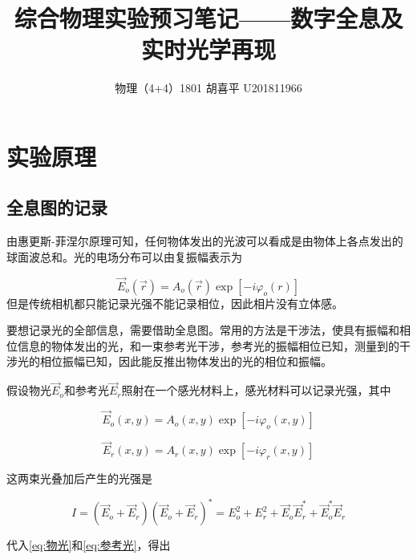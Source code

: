\documentclass{article}
\author{物理（4+4）1801 \quad  胡喜平 \quad U201811966}
\affil{个人网站 https://hxp.plus/ \quad 电子邮件 hxp201406@gmail.com}
\title{综合物理实验预习笔记——数字全息及实时光学再现}
\begin{document}
\maketitle\thispagestyle{fancy}




\section{实验原理}

\subsection{全息图的记录}

由惠更斯-菲涅尔原理可知，任何物体发出的光波可以看成是由物体上各点发出的球面波总和。光的电场分布可以由复振幅表示为

\begin{equation}
  \vec{E}_o \left( \vec{r} \right) = A_o \left( \vec{r} \right)  \exp \left[ - i \varphi_o \left( r \right) \right]
\end{equation}
但是传统相机都只能记录光强不能记录相位，因此相片没有立体感。

要想记录光的全部信息，需要借助全息图。常用的方法是干涉法，使具有振幅和相位信息的物体发出的光，和一束参考光干涉，参考光的振幅相位已知，测量到的干涉光的相位振幅已知，因此能反推出物体发出的光的相位和振幅。

假设物光$\vec{E}_o$和参考光$\vec{E}_r$照射在一个感光材料上，感光材料可以记录光强，其中

\begin{equation}
  \label{eq:物光}
  \vec{E}_o \left( x, y \right) = A_o \left( x, y \right) \exp \left[ - i \varphi_o \left( x, y \right) \right]
\end{equation} 

\begin{equation}
  \label{eq:参考光}
  \vec{E}_r \left( x, y \right) = A_r \left( x, y \right) \exp \left[ - i \varphi_r \left( x, y \right) \right]
\end{equation}

这两束光叠加后产生的光强是

\begin{equation}
  I = \left( \vec{E}_o + \vec{E}_r \right) \left( \vec{E}_o + \vec{E}_r \right)^{*} = E_o^2 + E_r^2 + \vec{E}_o \vec{E}_r^{*} + \vec{E}_o^{*} \vec{E}_r
\end{equation}

代入\ref{eq:物光}和\ref{eq:参考光}，得出
\end{document}
